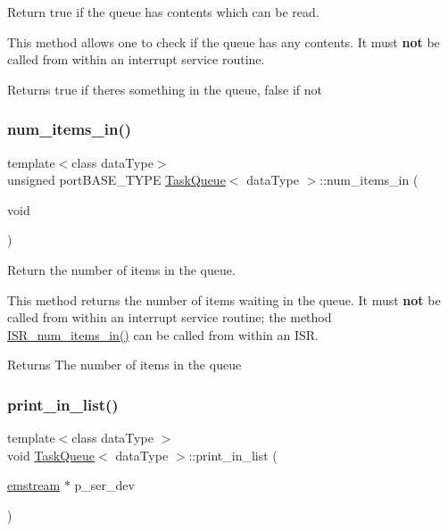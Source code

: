 Return true if the queue has contents which can be read. 

This method allows one to check if the queue has any contents. It must {\bfseries not} be called from within an interrupt service routine. \begin{DoxyReturn}{Returns}
{\ttfamily true} if there\textquotesingle{}s something in the queue, {\ttfamily false} if not 
\end{DoxyReturn}
\mbox{\label{class_task_queue_af6084d7ce87cefdfb3891dee4b3dfcfe}} 
\subsubsection{\texorpdfstring{num\+\_\+items\+\_\+in()}{num\_items\_in()}}
{\footnotesize\ttfamily template$<$class data\+Type$>$ \\
unsigned port\+B\+A\+S\+E\+\_\+\+T\+Y\+PE \mbox{\hyperlink{class_task_queue}{Task\+Queue}}$<$ data\+Type $>$\+::num\+\_\+items\+\_\+in (\begin{DoxyParamCaption}\item[{void}]{ }\end{DoxyParamCaption})\hspace{0.3cm}{\ttfamily [inline]}}



Return the number of items in the queue. 

This method returns the number of items waiting in the queue. It must {\bfseries not} be called from within an interrupt service routine; the method {\ttfamily \mbox{\hyperlink{class_task_queue_af3589846ebd5b842b0b74ffa7e1029af}{I\+S\+R\+\_\+num\+\_\+items\+\_\+in()}}} can be called from within an I\+SR. \begin{DoxyReturn}{Returns}
The number of items in the queue 
\end{DoxyReturn}
\mbox{\label{class_task_queue_ad5ccb9c99ca4f43304d408d915314d71}} 
\subsubsection{\texorpdfstring{print\+\_\+in\+\_\+list()}{print\_in\_list()}}
{\footnotesize\ttfamily template$<$class data\+Type $>$ \\
void \mbox{\hyperlink{class_task_queue}{Task\+Queue}}$<$ data\+Type $>$\+::print\+\_\+in\+\_\+list (\begin{DoxyParamCaption}\item[{\mbox{\hyperlink{classemstream}{emstream}} $\ast$}]{p\+\_\+ser\+\_\+dev }\end{DoxyParamCaption})\hspace{0.3cm}{\ttfamily [virtual]}}



